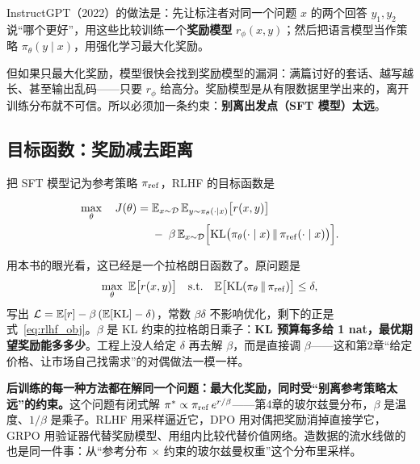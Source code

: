 InstructGPT（2022）的做法是：先让标注者对同一个问题 $x$ 的两个回答 $y_1, y_2$ 说“哪个更好”，用这些比较训练一个\textbf{奖励模型} $r_\phi(x, y)$；然后把语言模型当作策略 $\pi_\theta(y \mid x)$，用强化学习最大化奖励。

但如果只最大化奖励，模型很快会找到奖励模型的漏洞：满篇讨好的套话、越写越长、甚至输出乱码——只要 $r_\phi$ 给高分。奖励模型是从有限数据里学出来的，离开训练分布就不可信。所以必须加一条约束：\textbf{别离出发点（SFT 模型）太远}。

\subsection{目标函数：奖励减去距离}

把 SFT 模型记为参考策略 $\pi_{\rm ref}$，RLHF 的目标函数是

\begin{keyformula}[title=RLHF 的目标函数]
\begin{equation}
    \begin{aligned}
    \max_{\theta}\quad J(\theta) = \;&\mathbb{E}_{x\sim\mathcal{D}}\,\mathbb{E}_{y\sim\pi_\theta(\cdot\mid x)}\big[r(x,y)\big] \\
    &-\; \beta\,\mathbb{E}_{x\sim\mathcal{D}}\Big[\mathrm{KL}\big(\pi_\theta(\cdot\mid x)\,\|\,\pi_{\rm ref}(\cdot\mid x)\big)\Big].
    \end{aligned}
    \label{eq:rlhf_obj}
\end{equation}
\end{keyformula}

用本书的眼光看，这已经是一个拉格朗日函数了。原问题是
\begin{equation}
    \max_\theta\ \mathbb{E}\big[r(x,y)\big] \quad \text{s.t.} \quad \mathbb{E}\big[\mathrm{KL}(\pi_\theta\,\|\,\pi_{\rm ref})\big] \le \delta,
\end{equation}
写出 $\mathcal{L} = \mathbb{E}[r] - \beta\,(\mathbb{E}[\mathrm{KL}] - \delta)$，常数 $\beta\delta$ 不影响优化，剩下的正是式~\eqref{eq:rlhf_obj}。$\beta$ 是 KL 约束的拉格朗日乘子：\textbf{KL 预算每多给 1 nat，最优期望奖励能多多少}。工程上没人给定 $\delta$ 再去解 $\beta$，而是直接调 $\beta$——这和第2章“给定价格、让市场自己找需求”的对偶做法一模一样。

\begin{tcolorbox}[colback=yellow!10, colframe=orange!80, title=本章的核心观点]
\textbf{后训练的每一种方法都在解同一个问题：最大化奖励，同时受“别离参考策略太远”的约束。}这个问题有闭式解 $\pi^* \propto \pi_{\rm ref}\,e^{r/\beta}$——第4章的玻尔兹曼分布，$\beta$ 是温度、$1/\beta$ 是乘子。RLHF 用采样逼近它，DPO 用对偶把奖励消掉直接学它，GRPO 用验证器代替奖励模型、用组内比较代替价值网络。造数据的流水线做的也是同一件事：从“参考分布 $\times$ 约束的玻尔兹曼权重”这个分布里采样。
\end{tcolorbox}

